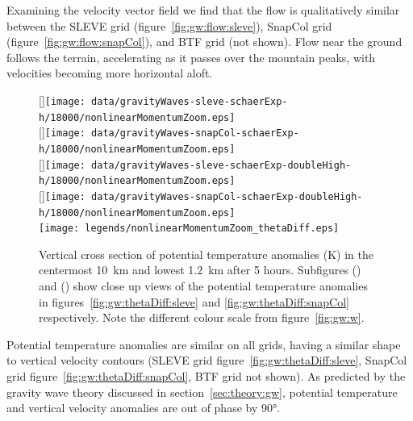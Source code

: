 Examining the velocity vector field we find that the flow is qualitatively similar between the SLEVE grid (figure~\ref{fig:gw:flow:sleve}), SnapCol grid (figure~\ref{fig:gw:flow:snapCol}), and BTF grid (not shown).  Flow near the ground follows the terrain, accelerating as it passes over the mountain peaks, with velocities becoming more horizontal aloft.  

\begin{figure}
	\captionsetup[subfigure]{position=b}
	\centering
	[\textwidth]{\texttt{[image: data/gravityWaves-sleve-schaerExp-h/18000/nonlinearMomentumZoom.eps]}} \\
	[\textwidth]{\texttt{[image: data/gravityWaves-snapCol-schaerExp-h/18000/nonlinearMomentumZoom.eps]}} \\
	[\textwidth]{\texttt{[image: data/gravityWaves-sleve-schaerExp-doubleHigh-h/18000/nonlinearMomentumZoom.eps]}} \\
	[\textwidth]{\texttt{[image: data/gravityWaves-snapCol-schaerExp-doubleHigh-h/18000/nonlinearMomentumZoom.eps]}} \\
%
	\texttt{[image: legends/nonlinearMomentumZoom\_thetaDiff.eps]}
	\caption{Vertical cross section of potential temperature anomalies (\si{\kelvin}) in the centermost \SI{10}{\kilo\meter} and lowest \SI{1.2}{\kilo\meter} after 5 hours.  Subfigures () and () show close up views of the potential temperature anomalies in figures~\ref{fig:gw:thetaDiff:sleve} and \ref{fig:gw:thetaDiff:snapCol} respectively.  Note the different colour scale from figure~\ref{fig:gw:w}.}
	\label{fig:gw:thetaDiffZoom}
\end{figure}

Potential temperature anomalies are similar on all grids, having a similar shape to vertical velocity contours (SLEVE grid figure~\ref{fig:gw:thetaDiff:sleve}, SnapCol grid figure~\ref{fig:gw:thetaDiff:snapCol}, BTF grid not shown).  As predicted by the gravity wave theory discussed in section~\ref{sec:theory:gw}, potential temperature and vertical velocity anomalies are out of phase by \ang{90}.

